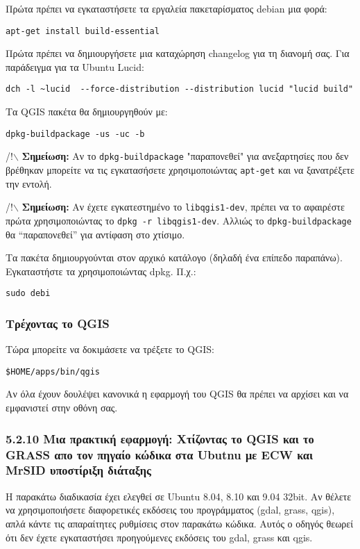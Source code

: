Πρώτα πρέπει να εγκαταστήσετε τα εργαλεία πακεταρίσματος debian μια φορά: 

\begin{verbatim}
apt-get install build-essential
\end{verbatim}

Πρώτα πρέπει να δημιουργήσετε μια καταχώρηση changelog για τη διανομή σας. Για παράδειγμα για τα Ubuntu Lucid:  

\begin{verbatim}
dch -l ~lucid  --force-distribution --distribution lucid "lucid build"
\end{verbatim}

Τα QGIS πακέτα θα δημιουργηθούν με: 

\begin{verbatim}
dpkg-buildpackage -us -uc -b
\end{verbatim}

/!$\backslash$ \textbf{Σημείωση:} Αν το \texttt{dpkg-buildpackage} "παραπονεθεί" για ανεξαρτησίες που δεν βρέθηκαν μπορείτε να τις εγκατασήσετε χρησιμοποιώντας \texttt{apt-get} και να ξανατρέξετε την εντολή.

/!$\backslash$ \textbf{Σημείωση:} Αν έχετε εγκατεστημένο το \texttt{libqgis1-dev}, πρέπει να το αφαιρέστε πρώτα χρησιμοποιώντας το \texttt{dpkg -r libqgis1-dev}.   Αλλιώς το \texttt{dpkg-buildpackage} θα “παραπονεθεί” για αντίφαση στο χτίσιμο.

Τα πακέτα δημιουργούνται στον αρχικό κατάλογο (δηλαδή ένα επίπεδο παραπάνω). Εγκαταστήστε τα χρησιμοποιώντας dpkg. Π.χ.:

\begin{verbatim}
sudo debi
\end{verbatim}

\hypertarget{toc12}{}
\subsubsection{Τρέχοντας το QGIS}
Τώρα μπορείτε να δοκιμάσετε να τρέξετε το QGIS:

\begin{verbatim}
$HOME/apps/bin/qgis 
\end{verbatim}

Αν όλα έχουν δουλέψει κανονικά η εφαρμογή του QGIS θα πρέπει να αρχίσει και να εμφανιστεί στην οθόνη σας. 

\hypertarget{toc13}{}
\subsubsection{5.2.10 Μια πρακτική εφαρμογή: Χτίζοντας το QGIS και το GRASS απο τον πηγαίο κώδικα στα Ubutnu με ECW και MrSID υποστίριξη διάταξης}
Η παρακάτω διαδικασία έχει ελεγθεί σε Ubuntu 8.04, 8.10 και 9.04 32bit. Αν θέλετε να χρησιμοποιήσετε διαφορετικές εκδόσεις του προγράμματος (gdal, grass, qgis), απλά κάντε τις απαραίτητες ρυθμίσεις στον παρακάτω κώδικα. Αυτός ο οδηγός θεωρεί ότι δεν έχετε εγκαταστήσει προηγούμενες εκδόσεις του gdal, grass και qgis. 

